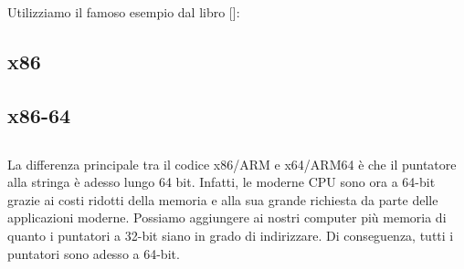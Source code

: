 \mysection{\HelloWorldSectionName}
\label{sec:helloworld}

Utilizziamo il famoso esempio dal libro [\KRBook]:



\subsection{x86}





\subsection{x86-64}







\subsection{\Conclusion{}}

La differenza principale tra il codice x86/ARM e x64/ARM64 è che il puntatore alla stringa è adesso lungo 64 bit.
Infatti, le moderne \ac{CPU} sono ora a 64-bit grazie ai costi ridotti della memoria e alla sua grande richiesta da parte delle applicazioni moderne.
Possiamo aggiungere ai nostri computer più memoria di quanto i puntatori a 32-bit siano in grado di indirizzare.
Di conseguenza, tutti i puntatori sono adesso a 64-bit.


